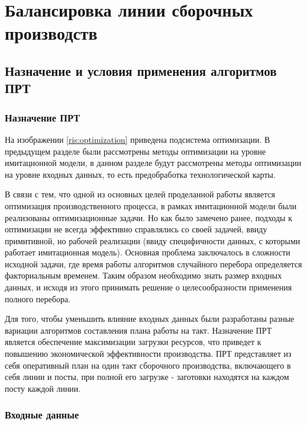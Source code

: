 \chapter{Балансировка линии сборочных производств}

\label{ALBP}


\section{Назначение и условия применения алгоритмов ПРТ}
\subsection{Назначение ПРТ}
На изображении \ref{ris:optimization} приведена подсистема оптимизации. В предыдущем разделе были рассмотрены методы оптимизации на уровне имитационной модели, в данном разделе будут рассмотрены методы оптимизации на уровне входных данных, то есть предобработка технологической карты.

В связи с тем, что одной из основных целей проделанной работы является оптимизация производственного процесса, в рамках имитационной модели были реализованы оптимизационные задачи. Но как было замечено ранее, подходы к оптимизации не всегда эффективно справлялись со своей задачей, ввиду примитивной, но рабочей реализации (ввиду специфичности данных, с которыми работает имитационная модель). Основная проблема заключалось в сложности исходной задачи, где время работы алгоритмов случайного перебора определяется факториальным временем. Таким образом необходимо знать размер входных данных, и исходя из этого принимать решение о целесообразности применения полного перебора.

Для того, чтобы уменьшить влияние входных данных были разработаны разные вариации алгоритмов составления плана работы на такт. Назначение ПРТ является обеспечение максимизации загрузки ресурсов, что приведет к повышению экономической эффективности производства. ПРТ представляет из себя оперативный план на один такт сборочного производства, включающего в себя линии и посты, при полной его загрузке - заготовки находятся на каждом посту каждой линии.

\subsection{Входные данные}

